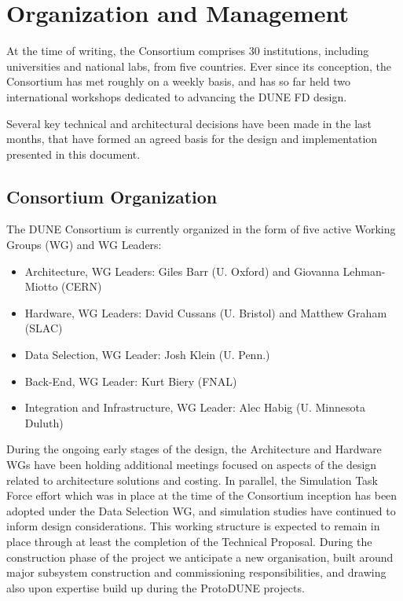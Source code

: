 
\section{Organization and Management}
\label{sec:fd-daq-org}

At the time of writing, the  Consortium comprises 30 institutions, including universities and national labs, from five countries. Ever since its conception, the  Consortium has met roughly on a weekly basis, and has so far held two international workshops dedicated to advancing the DUNE FD  design.

Several key technical and architectural decisions have been made in the last months, that have formed an agreed basis for the  design and implementation presented in this document.

\subsection{ Consortium Organization}
\label{sec:fd-daq-org-consortium}

The DUNE  Consortium is currently organized in the form of five active
Working Groups (WG) and WG Leaders:
\begin{itemize}
\item Architecture, WG Leaders: Giles Barr (U. Oxford) and Giovanna Lehman-Miotto (CERN)
\item Hardware, WG Leaders: David Cussans (U. Bristol) and Matthew Graham (SLAC)
\item Data Selection, WG Leader: Josh Klein (U. Penn.)
\item Back-End, WG Leader: Kurt Biery (FNAL)
\item Integration and Infrastructure, WG Leader: Alec Habig
  (U. Minnesota Duluth)
\end{itemize}

During the ongoing early stages of the design, the Architecture and Hardware WGs have been holding additional meetings focused on aspects of the design related to architecture solutions and costing. In parallel, the  Simulation Task Force effort which was in place at the time of the Consortium inception has been adopted under the Data Selection WG, and simulation studies have continued to inform design considerations. This working structure is expected to remain in place through at least the completion of the Technical Proposal. During the construction phase of the project we anticipate a new organisation, built around major subsystem construction and commissioning responsibilities, and drawing also upon expertise build up during the ProtoDUNE projects.

